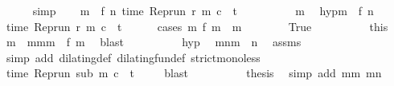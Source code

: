 \begin{isabellebody}
\ \ \ \ \isamarkupfalse%
\ simp\isanewline
\ \ \isamarkupfalse%
\ {\isacartoucheopen}{\isasymforall}m\ {\isacharless}\ f\ n{\isachardot}\ time\ {\isacharparenleft}{\isacharparenleft}Rep{\isacharunderscore}run\ r{\isacharparenright}\ m\ c{\isacharparenright}\ {\isacharless}\ t{\isacartoucheclose}\isanewline
\ \ \isamarkupfalse%
\ {\isacharminus}\isanewline
\ \ \isacommand{{\isacharbraceleft}}\isamarkupfalse%
\ \isamarkupfalse%
\ m\ \isamarkupfalse%
\ hyp{\isacharcolon}{\isacartoucheopen}m\ {\isacharless}\ f\ n{\isacartoucheclose}\isanewline
\ \ \ \ \isamarkupfalse%
\ {\isacartoucheopen}time\ {\isacharparenleft}{\isacharparenleft}Rep{\isacharunderscore}run\ r{\isacharparenright}\ m\ c{\isacharparenright}\ {\isacharless}\ t{\isacartoucheclose}\isanewline
\ \ \ \ \isamarkupfalse%
\ {\isacharparenleft}cases\ {\isacartoucheopen}{\isasymexists}m\ f\ m\ {\isacharequal}\ m{\isacartoucheclose}{\isacharparenright}\isanewline
\ \ \ \ \ \ \isamarkupfalse%
\ True\isanewline
\ \ \ \ \ \ \ \ \isamarkupfalse%
\ this\ \isamarkupfalse%
\ m\ \ mm{}{\isacharcolon}{\isacartoucheopen}m\ {\isacharequal}\ f\ m\ \isamarkupfalse%
\ blast\isanewline
\ \ \ \ \ \ \ \ \isamarkupfalse%
\ hyp\ \isamarkupfalse%
\ m{}n{\isacharcolon}{\isacartoucheopen}m\ {\isacharless}\ n{\isacartoucheclose}\ \isamarkupfalse%
\ assms{\isacharparenleft}{}{\isacharparenright}\isanewline
\ \ \ \ \ \ \ \ \ \ \isamarkupfalse%
\ {\isacharparenleft}simp\ add{\isacharcolon}\ dilating{\isacharunderscore}def\ dilating{\isacharunderscore}fun{\isacharunderscore}def\ strict{\isacharunderscore}mono{\isacharunderscore}less{\isacharparenright}\isanewline
\ \ \ \ \ \ \ \ \isamarkupfalse%
\ {\isacartoucheopen}time\ {\isacharparenleft}{\isacharparenleft}Rep{\isacharunderscore}run\ sub{\isacharparenright}\ m\ c{\isacharparenright}\ {\isacharless}\ t{\isacartoucheclose}\ \isamarkupfalse%
\ {\isacharasterisk}\ \isamarkupfalse%
\ blast\isanewline
\ \ \ \ \ \ \ \ \isamarkupfalse%
\ {\isacharquery}thesis\ \isamarkupfalse%
\ {\isacharparenleft}simp\ add{\isacharcolon}\ mm{}\ m{}n\ {\isacharasterisk}{\isacharasterisk}{\isacharparenright}\isanewline

\end{isabellebody}
